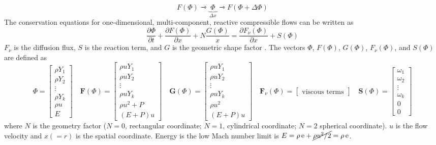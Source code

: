 \documentclass{homework}
\begin{document}
$$F(\Phi) \rightarrowtriangle \underbrace{\boxed{ \; \Phi \; }}_{\Delta x} \rightarrowtriangle F(\Phi + \Delta \Phi)$$ 
The conservation equations for one-dimensional, multi-component, reactive compressible flows can be written as
$$ \frac{\partial \Phi}{\partial t} + \frac{\partial F (\Phi)}{\partial x} + N \frac{G (\Phi)}{x} = \frac{\partial F_\nu (\Phi)}{\partial x} + S (\Phi) $$
$F_\nu$ is the diffusion flux, $S$ is the reaction term, and $G$ is the geometric shape factor \cite{Chen_thesis}. The vectors $\Phi$, $F (\Phi)$, $G (\Phi)$, $F_\nu(\Phi)$, and $S (\Phi)$ are defined as
\begin{equation*}
    \Phi = \begin{bmatrix}
    \rho Y_1 \\
    \rho Y_2 \\
    \vdots \\
    \rho Y_k \\
    \rho u \\
    E
    \end{bmatrix} \quad
    \textbf{F}(\Phi) = \begin{bmatrix}
    \rho u Y_1 \\
    \rho u Y_2 \\
    \vdots \\
    \rho u Y_k \\
    \rho {u}^2 + P \\
    (E + P) u
    \end{bmatrix} \quad
    \textbf{G}(\Phi) = \begin{bmatrix}
    \rho u Y_1 \\
    \rho u Y_2 \\
    \vdots \\
    \rho u Y_k \\
    \rho {u}^2 \\
    (E + P) u
    \end{bmatrix} \quad
    \textbf{F$_\nu$}(\Phi) = \begin{bmatrix}
    \textrm{viscous terms}
    \end{bmatrix} \quad
    \textbf{S}(\Phi) = \begin{bmatrix}
    \omega_1 \\
    \omega_2 \\
    \vdots \\
    \omega_k \\
    0 \\
    0
    \end{bmatrix}
\end{equation*}
where $N$ is the geometry factor ($N=0$, rectangular coordinate; $N=1$, cylindrical coordinate; $N=2$ spherical coordinate). $u$ is the flow velocity and $x(=r)$ is the spatial coordinate. Energy is the low Mach number limit is $E = \rho \, \textrm{e} + \cancel{\rho u^2 / 2} = \rho \, \textrm{e}$.
\end{document}
